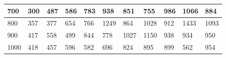 \documentclass[10pt,letterpaper]{article}
\begin{document}
\begin{center}
\begin{table}
\begin{tabular} { |m{0.5cm}|m{1.3cm}|m{1.3cm}|m{1.3cm}|m{1.3cm}|m{1.3cm}|m{1.3cm}|m{1.3cm}|m{1.3cm}|m{1.3cm}|m{1.3cm}|}
\hline
\cellcolor{Gray}700 & \Large 300 & \Large 487 & \Large 586 & \Large 783 & \Large 938 & \Large 851 & \Large 755 & \Large 986 & \Large 1066 & \Large 884 \\
\hline
\cellcolor{Gray}800 & \Large 357 & \Large 377 & \Large 654 & \Large 766 & \Large 1249 & \Large 864 & \Large 1028 & \Large 912 & \Large 1433 & \Large 1093 \\
\hline
\cellcolor{Gray}900 & \Large 417 & \Large 558 & \Large 499 & \Large 844 & \Large 778 & \Large 1027 & \Large 1150 & \Large 938 & \Large 934 & \Large 950 \\
\hline
\cellcolor{Gray}1000 & \Large 418 & \Large 457 & \Large 596 & \Large 582 & \Large 696 & \Large 824 & \Large 895 & \Large 899 & \Large 562 & \Large 954 \\
\hline
\end{tabular} \\
\end{table}
\end{center}
\newpage 
{}
\end{document}
